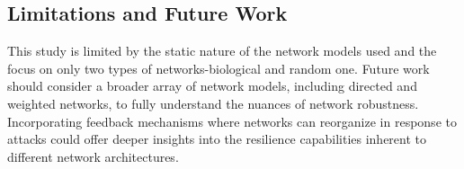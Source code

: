 \documentclass[
	report, %
	11pt, %
]{CSUniSchoolLabReport}
\newcounter{ct}
\begin{document}
\subsection{Limitations and Future Work}
This study is limited by the static nature of the network models used and the focus on only two types of networks-biological and random one. Future work should consider a broader array of network models, including directed and weighted networks, to fully understand the nuances of network robustness. Incorporating feedback mechanisms where networks can reorganize in response to attacks could offer deeper insights into the resilience capabilities inherent to different network architectures.
\end{document}
